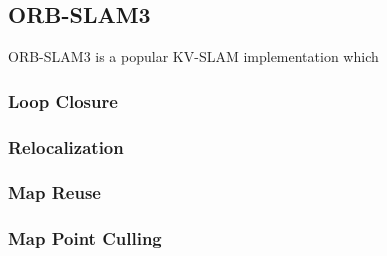 \subsection{ORB-SLAM3}

ORB-SLAM3 is a popular KV-SLAM implementation which 

\subsubsection{Loop Closure}
\subsubsection{Relocalization}
\subsubsection{Map Reuse}
\subsubsection{Map Point Culling}